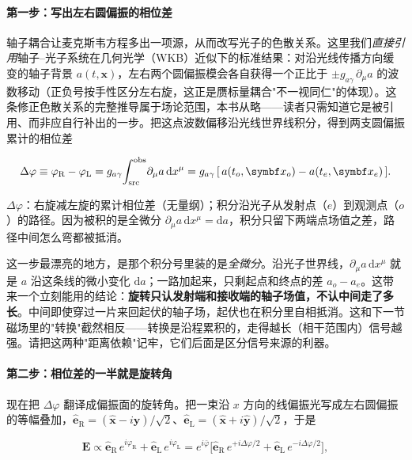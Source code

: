 \paragraph{第一步：写出左右圆偏振的相位差}

轴子耦合让麦克斯韦方程多出一项源，从而改写光子的色散关系。这里我们\emph{直接引用}轴子--光子系统在几何光学（WKB）近似下的标准结果：对沿光线传播方向缓变的轴子背景 \(a(t,\bm x)\)，左右两个圆偏振模会各自获得一个正比于 \(\pm g_{a\gamma}\,\partial_\mu a\) 的波数移动（正负号按手性区分左右旋，这正是赝标量耦合"不一视同仁"的体现）。这条修正色散关系的完整推导属于场论范围，本书从略——读者只需知道它是被引用、而非应自行补出的一步。把这点波数偏移沿光线世界线积分，得到两支圆偏振累计的相位差

\begin{equation}
  \Delta\varphi \equiv \varphi_{\mathrm R}-\varphi_{\mathrm L}
  = g_{a\gamma}\!\int_{\rm src}^{\rm obs}\! \partial_\mu a\,\mathrm dx^\mu
  = g_{a\gamma}\,[\,a(t_o,\bm x_o)-a(t_e,\bm x_e)\,].
  \label{eq:e22-phase-diff}
\end{equation}
\begin{formulaexplain}
\(\Delta\varphi\)：右旋减左旋的累计相位差（无量纲）；积分沿光子从发射点（\(e\)）到观测点（\(o\)）的路径。因为被积的是全微分 \(\partial_\mu a\,\mathrm dx^\mu=\mathrm da\)，积分只留下两端点场值之差，路径中间怎么弯都被抵消。
\end{formulaexplain}

这一步最漂亮的地方，是那个积分号里装的是\emph{全微分}。沿光子世界线，\(\partial_\mu a\,\mathrm dx^\mu\) 就是 \(a\) 沿这条线的微小变化 \(\mathrm da\)；一路加起来，只剩起点和终点的差 \(a_o-a_e\)。这带来一个立刻能用的结论：\textbf{旋转只认发射端和接收端的轴子场值，不认中间走了多长}。中间即使穿过一片来回起伏的轴子场，起伏也在积分里自相抵消。这和下一节磁场里的"转换"截然相反——转换是沿程累积的，走得越长（相干范围内）信号越强。请把这两种"距离依赖"记牢，它们后面是区分信号来源的利器。

\paragraph{第二步：相位差的一半就是旋转角}

现在把 \(\Delta\varphi\) 翻译成偏振面的旋转角。把一束沿 \(x\) 方向的线偏振光写成左右圆偏振的等幅叠加，\(\hat{\bm e}_{\mathrm R}=(\hat{\bm x}-i\hat{\bm y})/\sqrt2\)、\(\hat{\bm e}_{\mathrm L}=(\hat{\bm x}+i\hat{\bm y})/\sqrt2\)，于是

\[
  \bm E \propto \hat{\bm e}_{\mathrm R}\,e^{i\varphi_{\mathrm R}}
              +\hat{\bm e}_{\mathrm L}\,e^{i\varphi_{\mathrm L}}
  = e^{i\bar\varphi}\Big[\hat{\bm e}_{\mathrm R}\,e^{+i\Delta\varphi/2}
                        +\hat{\bm e}_{\mathrm L}\,e^{-i\Delta\varphi/2}\Big],
\]

